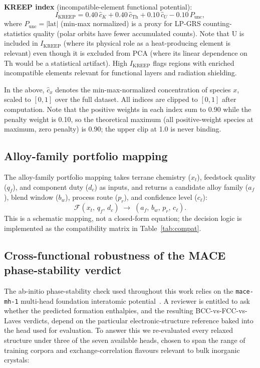 \documentclass[11pt,a4paper]{article}
\begin{document}
\textbf{KREEP index} (incompatible-element functional potential):
\begin{equation}
I_{\mathrm{KREEP}} = 0.40\,\hat{c}_K + 0.40\,\hat{c}_{\mathrm{Th}} + 0.10\,\hat{c}_U - 0.10\,P_{\mathrm{unc}},
\label{eq:IKREEP}
\end{equation}
where $P_{\mathrm{unc}} = |\mathrm{lat}|$ (min-max normalized) is a proxy for LP-GRS counting-statistics quality (polar orbits have fewer accumulated counts). Note that U is included in $I_{\mathrm{KREEP}}$ (where its physical role as a heat-producing element is relevant) even though it is excluded from PCA (where its linear dependence on Th would be a statistical artifact). High $I_{\mathrm{KREEP}}$ flags regions with enriched incompatible elements relevant for functional layers and radiation shielding.

In the above, $\hat{c}_x$ denotes the min-max-normalized concentration of species $x$, scaled to $[0,1]$ over the full dataset. All indices are clipped to $[0, 1]$ after computation. Note that the positive weights in each index sum to 0.90 while the penalty weight is 0.10, so the theoretical maximum (all positive-weight species at maximum, zero penalty) is 0.90; the upper clip at 1.0 is never binding.

\subsection{Alloy-family portfolio mapping}

The alloy-family portfolio mapping takes terrane chemistry ($x_t$), feedstock quality ($q_f$), and component duty ($d_c$) as inputs, and returns a candidate alloy family ($a_f$), blend window ($b_w$), process route ($p_r$), and confidence level ($c_\ell$):
\[
\mathcal{F}(x_t,\,q_f,\,d_c)\;\rightarrow\;(a_f,\,b_w,\,p_r,\,c_\ell).
\]
This is a schematic mapping, not a closed-form equation; the decision logic is implemented as the compatibility matrix in Table~\ref{tab:compat}.

\subsection{Cross-functional robustness of the MACE phase-stability verdict}
\label{subsec:multihead}

The ab-initio phase-stability check used throughout this work relies on the \texttt{mace-mh-1} multi-head foundation interatomic potential~\cite{Batatia2025MACEMH1}. A reviewer is entitled to ask whether the predicted formation enthalpies, and the resulting BCC-vs-FCC-vs-Laves verdicts, depend on the particular electronic-structure reference baked into the head used for evaluation. To answer this we re-evaluated every relaxed structure under three of the seven available heads, chosen to span the range of training corpora and exchange-correlation flavours relevant to bulk inorganic crystals:
\end{document}
